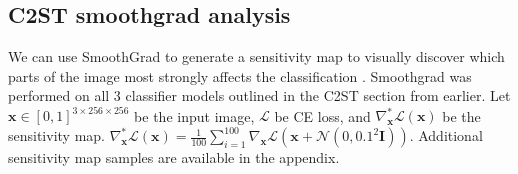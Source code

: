 \documentclass{article}
\begin{document}
        \subsection{C2ST smoothgrad analysis}
        We can use SmoothGrad to generate a sensitivity map to visually discover which parts of the image most strongly affects the classification \cite{smoothgrad}.
        Smoothgrad was performed on all 3 classifier models outlined in the C2ST section from earlier. 
        Let $\mathbf{x} \in [0, 1]^{3 \times 256 \times 256}$ be the input image, $\mathcal{L}$ be CE loss, and $\nabla_{\mathbf{x}}^{*} \mathcal{L} (\mathbf{x})$ be the sensitivity map. $\nabla_{\mathbf{x}}^{*} \mathcal{L} (\mathbf{x}) = \frac{1}{100} \sum_{i=1}^{100} \nabla_{\mathbf{x}} \mathcal{L} (\mathbf{x} + \mathcal{N}(0, 0.1^2\mathbf{I}))$. 
        Additional sensitivity map samples are available in the appendix.
        
\end{document}
